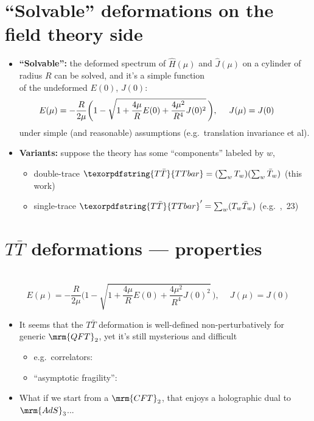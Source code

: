 \documentclass[10pt]{article}
\renewenvironment{frame}[1]%
	{\section*{#1}}%
	{\clearpage}
\newcommand{\pause}{}
\newcommand{\TTbar}{\texorpdfstring{\ensuremath{T\bar{T}}}{TTbar}\xspace}
\begin{document}
\begin{frame}{``Solvable'' deformations on the field theory side}{%
	\citeTTbar
}
\begin{itemize}

\item \textbf{``Solvable'':} the deformed spectrum of $\hat{H}(\mu)$ and $\hat{J}(\mu)$ on a cylinder of radius $R$ can be solved, 
and it's a simple function\\
 of the undeformed $E(0)$, $J(0)$:
\begin{equation}
\hspace{-2em}
	E(\mu) = - \frac{R }{ 2\mu } \bigg(1-\sqrt{1 + \frac{4\mu}{R} E(0) + \frac{4\mu^2}{R^4} J(0)^2 }
	\,\bigg), \ \quad J(\mu)=J(0) %
\end{equation}
under simple (and reasonable) assumptions (e.g.~translation invariance et al). 

\item \textbf{Variants:} suppose the theory has some ``components'' labeled by $w$,

\pause

\begin{itemize}
\item double-trace $\TTbar = (\sum_w T_w) (\sum_w \bar{T}_w)$ (this work)
\item single-trace $\TTbar' = \sum_w (T_w \bar{T}_w)$ (e.g.~\textit{\citeauthor{Cui:2023jrb}},~23)
\end{itemize}

\end{itemize}

\vspace{.5\baselineskip}
\end{frame}

\begin{frame}{\TTbar deformations --- properties}{%
	\textcite{Zamolodchikov:2004ce}\\
}
\vspace{-1.\baselineskip}
\begin{equation}
	E(\mu) = - \frac{R }{ 2\mu } \bigg(1-\sqrt{1 + \frac{4\mu}{R} E(0) + \frac{4\mu^2}{R^4} J(0)^2 }
	\,\bigg), \ \quad J(\mu)=J(0)  \label{ttbarspectrum}
\end{equation}
\vspace{-\baselineskip}
\begin{itemize}
\item It seems that the \TTbar deformation is well-defined non-perturbatively for generic $\mrm{QFT}_2$,
yet it's still mysterious and difficult\\
\begin{itemize}
\item e.g.~correlators: \textcite{Kraus:2018xrn,Cardy:2019qao,Cui:2023jrb}
\item ``asymptotic fragility'': \textcite{Dubovsky:2017cnj}
\end{itemize}

\pause
\item What if we start from a $\mrm{CFT}_2$, that enjoys a holographic dual to $\mrm{AdS}_3$...

\end{itemize}
\end{frame}
\end{document}
